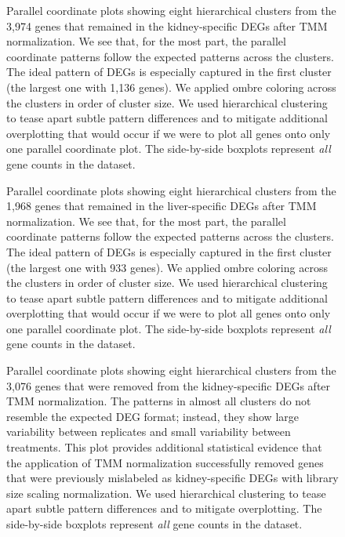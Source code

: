 \documentclass{bmcart}
\begin{document}
\begin{linenumbers}
\begin{backmatter}
\begin{figure}[h!]
\caption{
Parallel coordinate plots showing eight hierarchical clusters from the 3,974 genes that remained in the kidney-specific DEGs after TMM normalization. We see that, for the most part, the parallel coordinate patterns follow the expected patterns across the clusters. The ideal pattern of DEGs is especially captured in the first cluster (the largest one with 1,136 genes). We applied ombre coloring across the clusters in order of cluster size. We used hierarchical clustering to tease apart subtle pattern differences and to mitigate additional overplotting that would occur if we were to plot all genes onto only one parallel coordinate plot. The side-by-side boxplots represent \textit{all} gene counts in the dataset.
\label{lkClustersKeep}}
\end{figure}

\begin{figure}[h!]
\caption{
Parallel coordinate plots showing eight hierarchical clusters from the 1,968 genes that remained in the liver-specific DEGs after TMM normalization. We see that, for the most part, the parallel coordinate patterns follow the expected patterns across the clusters. The ideal pattern of DEGs is especially captured in the first cluster (the largest one with 933 genes). We applied ombre coloring across the clusters in order of cluster size. We used hierarchical clustering to tease apart subtle pattern differences and to mitigate additional overplotting that would occur if we were to plot all genes onto only one parallel coordinate plot. The side-by-side boxplots represent \textit{all} gene counts in the dataset.
\label{lkClustersOrig}}
\end{figure}

\begin{figure}[h!]
\caption{
Parallel coordinate plots showing eight hierarchical clusters from the 3,076 genes that were removed from the kidney-specific DEGs after TMM normalization. The patterns in almost all clusters do not resemble the expected DEG format; instead, they show large variability between replicates and small variability between treatments. This plot provides additional statistical evidence that the application of TMM normalization successfully removed genes that were previously mislabeled as kidney-specific DEGs with library size scaling normalization. We used hierarchical clustering to tease apart subtle pattern differences and to mitigate overplotting. The side-by-side boxplots represent \textit{all} gene counts in the dataset.
\label{lkClustersRemove}}
\end{figure}


\end{backmatter}
\end{linenumbers}
\end{document}
